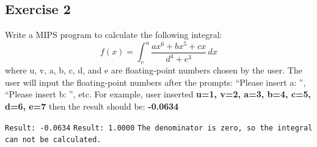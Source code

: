 \subsection{Exercise 2}
Write a MIPS program to calculate the following integral:
\begin{equation}
  f(x) = \int_{v}^{u} \frac{ax^6 + bx^5 + cx}{d^4 + e^3}\,dx
\end{equation}
where u, v, a, b, c, d, and e are floating-point numbers chosen by the user.
The user will input the floating-point numbers after the prompts: ``Please
insert a: '', ``Please insert b: '', etc. For example, user inserted \textbf{u=1, v=2,
a=3, b=4, c=5, d=6, e=7} then the result should be: \textbf{-0.0634}

%
  {\texttt{Result: -0.0634}}
%
  {\texttt{Result: 1.0000}}
%
  {\texttt{The denominator is zero, so the integral can not be calculated.}}
